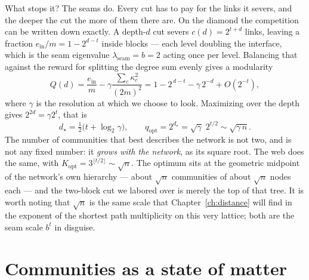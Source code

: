 What stops it? The seams do. Every cut has to pay for the links it severs, and the
deeper the cut the more of them there are. On the diamond the competition can be
written down exactly. A depth-$d$ cut severs $c(d)=2^{t+d}$ links, leaving a
fraction $e_{\mathrm{in}}/m=1-2^{d-t}$ inside blocks --- each level doubling the
interface, which is the seam eigenvalue $\lambda_{\mathrm{seam}}=b=2$ acting once
per level. Balancing that against the reward for splitting the degree sum evenly
gives a modularity
\begin{equation}
  Q(d) = \frac{e_{\mathrm{in}}}{m} - \gamma\frac{\sum_c \kappa_c^2}{(2m)^2}
  = 1 - 2^{\,d-t} - \gamma\,2^{-d} + O(2^{-t}),
  \label{eq:com-Qd}
\end{equation}
where $\gamma$ is the resolution at which we choose to look. Maximizing over the
depth gives $2^{2d}=\gamma 2^{t}$, that is
\begin{equation}
  d_\star = \tfrac{1}{2}\big(t+\log_2\gamma\big),
  \qquad
  q_{\mathrm{opt}} = 2^{d_\star} = \sqrt{\gamma}\;2^{t/2} \sim \sqrt{\gamma\,n}.
  \label{eq:com-qopt}
\end{equation}
The number of communities that best describes the network is not two, and is not
any fixed number: it \emph{grows with the network}, as its square root. The web
does the same, with $K_{\mathrm{opt}}=3^{\lfloor t/2\rfloor}\sim\sqrt{n}$. The
optimum sits at the geometric midpoint of the network's own hierarchy --- about
$\sqrt{n}$ communities of about $\sqrt{n}$ nodes each --- and the two-block cut we
labored over is merely the top of that tree. It is worth noting that $\sqrt{n}$ is
the same scale that Chapter~\ref{ch:distance} will find in the exponent of the
shortest path multiplicity on this very lattice; both are the seam scale $b^t$ in
disguise.

\section{Communities as a state of matter}

